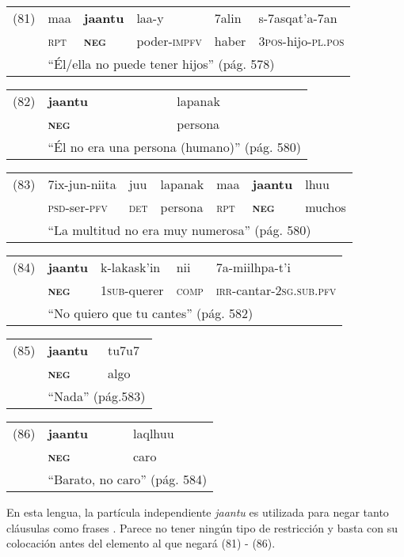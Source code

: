 {\setmainfont{Charis SIL} 

\begin{tabular}{llllll}
(81) & maa & \textbf{jaantu} & laa-y & 7alin & s-7asqat'a-7an \\
& \textsc{rpt} & \textsc{\textbf{neg}} & poder-\textsc{impfv} & haber & \textsc{3pos}-hijo-\textsc{pl.pos} \\
& \multicolumn{5}{l}{``Él/ella no puede tener hijos'' (pág. 578)}
\end{tabular} \vspace{0.4cm}

\begin{tabular}{lll}
(82) & \textbf{jaantu} & lapanak \\
& \textsc{\textbf{neg}} & persona \\
& \multicolumn{2}{l}{``Él no era una persona (humano)'' (pág. 580)}
\end{tabular} \vspace{0.4cm}

\begin{tabular}{lllllll}
(83) & 7ix-jun-niita & juu & lapanak & maa & \textbf{jaantu} & lhuu \\
& \textsc{psd}-ser-\textsc{pfv} & \textsc{det} & persona & \textsc{rpt} & \textsc{\textbf{neg}} & muchos \\
& \multicolumn{6}{l}{``La multitud no era muy numerosa'' (pág. 580)}
\end{tabular} \vspace{0.4cm}

\begin{tabular}{lllll}
(84) & \textbf{jaantu} & k-lakask'in & nii & 7a-miilhpa-t'i \\
& \textsc{\textbf{neg}} & \textsc{1sub}-querer & \textsc{comp} & \textsc{irr}-cantar-\textsc{2sg.sub.pfv}\\
& \multicolumn{4}{l}{``No quiero que tu cantes'' (pág. 582)}
\end{tabular} \vspace{0.4cm}

\begin{tabular}{lll}
(85) & \textbf{jaantu} & tu7u7 \\
& \textsc{\textbf{neg}} & algo \\
& \multicolumn{2}{l}{``Nada'' (pág.583)}
\end{tabular} \vspace{0.4cm}

\begin{tabular}{lll}
(86) & \textbf{jaantu} & laqlhuu \\
& \textsc{\textbf{neg}} & caro \\
& \multicolumn{2}{l}{``Barato, no caro'' (pág. 584)}
\end{tabular} \vspace{0.4cm}

}

En esta lengua, la partícula independiente {\setmainfont{Charis SIL} \textit{jaantu}} es utilizada para negar tanto cláusulas como frases \textcolor{MidnightBlue}{\citep{Tepehua}}. Parece no tener ningún tipo de restricción y basta con su colocación antes del elemento al que negará (81) - (86).